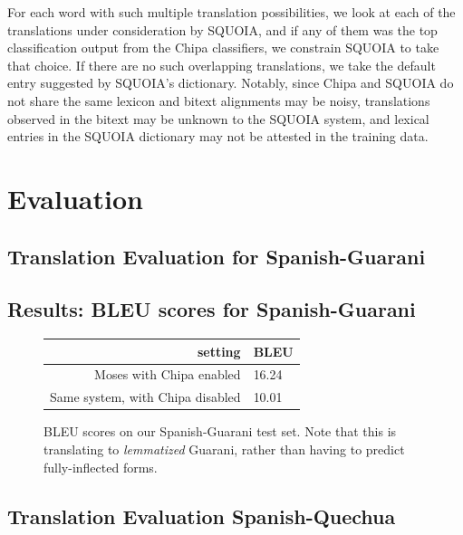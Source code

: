 For each word with such multiple translation possibilities, we look at each of
the translations under consideration by SQUOIA, and if any of them was the top 
classification output from the Chipa classifiers, we constrain SQUOIA to take
that choice.
If there are no such overlapping translations, we
take the default entry suggested by SQUOIA's dictionary.
Notably, since Chipa and SQUOIA do not share the same lexicon and bitext alignments
may be noisy, translations
observed in the bitext may be unknown to the SQUOIA system, and lexical entries in the
SQUOIA dictionary may not be attested in the training data.

\section{Evaluation}

\subsection{Translation Evaluation for Spanish-Guarani}


\subsection{Results: BLEU scores for Spanish-Guarani}
\begin{figure}
  \begin{centering}
  \begin{tabulary}{\textwidth}{|R|L|}
    \hline
    setting & BLEU \\
    \hline
    Moses with Chipa enabled &  16.24 \\
    \hline
    Same system, with Chipa disabled &  10.01 \\
    \hline
  \end{tabulary}
  \end{centering}
  \caption{BLEU scores on our Spanish-Guarani test set. Note that this is
  translating to \emph{lemmatized} Guarani, rather than having to predict
  fully-inflected forms.}
  \label{fig:pyramid-extras-results}
\end{figure}


\subsection{Translation Evaluation Spanish-Quechua}

